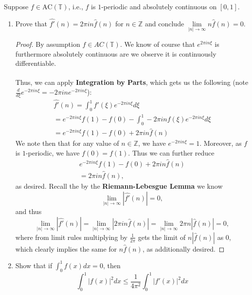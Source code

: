 \documentclass[12pt]{article}
\newenvironment{ex}[2][Exercise]{\begin{trivlist}
\item[\hskip \labelsep {\bfseries #1}\hskip \labelsep {\bfseries #2.}]}{\end{trivlist}}
\begin{document}
\begin{ex}{6}
    Suppose $f \in \text{AC}(\mathbb{T})$, i.e., $f$ is $1$-periodic and absolutely continuous on $[0,1]$.
    \begin{enumerate}[label=6.\arabic*]
        \item Prove that $\hat{f'}(n) = 2\pi in\hat{f}(n)$ for $n \in \mathbb{Z}$ and conclude $\underset{|n| \rightarrow \infty}{\lim} n\hat{f}(n) = 0$.
        \begin{proof}
            By assumption $f \in AC(\mathbb{T})$. We know of course that $e^{2\pi in\xi}$ is furthermore absolutely continuous are we observe it is continuously differentiable. \\ \\
            Thus, we can apply \textbf{Integration by Parts}, which gets us the following (note $\frac{d}{d\xi} e^{-2\pi in\xi} = -2\pi ine^{-2\pi in\xi}$):
            \begin{align*}
                \hat{f'}(n) = \int_0^1 f'(\xi) e^{-2\pi i n\xi} d\xi \\
                = e^{-2\pi in\xi}f(1) - f(0) - \int_0^1 -2\pi in f(\xi)e^{-2\pi in \xi} d\xi \\
                = e^{-2\pi in\xi}f(1) - f(0) + 2\pi i n \hat{f}(n)
            \end{align*}
            We note then that for any value of $n \in \mathbb{Z}$, we have $e^{-2\pi in\xi} = 1$. Moreover, as $f$ is $1$-periodic, we have $f(0) = f(1)$. Thus we can further reduce 
            \begin{align*}
                e^{-2\pi in\xi}f(1) - f(0) + 2\pi i n \hat{f}(n) \\
                = 2\pi in\hat{f}(n),
            \end{align*}
            as desired. Recall the by the \textbf{Riemann-Lebesgue Lemma} we know 
            $$\underset{|n| \rightarrow \infty}{\lim} |\hat{f'}(n)| = 0,$$
            and thus 
            $$\underset{|n| \rightarrow \infty}{\lim} |\hat{f'}(n)| = \underset{|n| \rightarrow \infty}{\lim} |2\pi i n \hat{f}(n)| = \underset{|n| \rightarrow \infty}{\lim} 2\pi n |\hat{f}(n)| = 0,$$
            where from limit rules multiplying by $\frac{1}{2\pi}$ gets the limit of $n|\hat{f}(n)|$ as $0$, which clearly implies the same for $n\hat{f}(n)$, as additionally desired.
        \end{proof}
        \item Show that if $\int_0^1 f(x) dx = 0$, then 
        $$\int_0^1 |f(x)|^2 dx \leq \frac{1}{4\pi^2} \int_0^1 |f'(x)|^2 dx$$
    \end{enumerate}
\end{ex}
\end{document}

